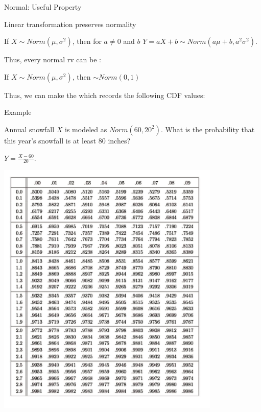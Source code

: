 \begin{frame}{Normal: Useful Property}

\plitemsep 0.1in
\bci 
\item<2-> Linear transformation preserves normality

{
If $X \sim  Norm(\mu, \sigma^2) $, then for $a \neq 0$ and $b$ $Y = aX +b \sim Norm(a\mu +b,a^2 \sigma^2).$ 
}

\item<3-> Thus, every normal rv can be : 

If $X \sim  Norm(\mu, \sigma^2)$, then 
 $\sim Norm(0,1)$

\item<5-> Thus, we can make the  which records the following CDF values:

\eci
\end{frame}

\begin{frame}{Example}

\medskip

{
\plitemsep 0.1in
\bci 
\item<1-> Annual snowfall $X$ is modeled as $Norm(60,20^2).$ What is the probability that this year's snowfall is at least 80 inches?

\item<2-> $Y = \frac{X-60}{20}.$
\eci
}
{
\includegraphics[width=0.8\textwidth]{L4_normal_table.png}
}
\end{frame}



